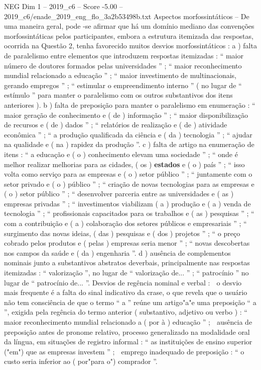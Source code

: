 \begin{textsample}{NEG Dim 1 – 2019\_c6 – Score -5.00 – 2019\_c6/enade\_2019\_eng\_flo\_3a2b53498b.txt}
Aspectos morfossintáticos – De uma maneira geral, pode -se afirmar que há um domínio mediano das convenções morfossintáticas pelos participantes, embora a estrutura itemizada das respostas, ocorrida na Questão 2, tenha favorecido muitos desvios morfossintáticos : a ) falta de paralelismo entre elementos que introduzem respostas itemizadas : “ maior número de doutores formados pelas universidades ” ; “ maior reconhecimento mundial relacionado a educação ” ; “ maior investimento de multinacionais, gerando empregos ” ; “ estimular o empreendimento interno ” ( no lugar de “ estímulo ” para manter o paralelismo com os outros substantivos dos itens anteriores ). b ) falta de preposição para manter o paralelismo em enumeração : “ maior geração de conhecimento e ( de ) informação ” ; “ maior disponibilização de recursos e ( de ) dados ” ; “ relatórios de realização e ( de ) atividade econômica ” ; “ a produção qualificada da ciência e ( da ) tecnologia ” ; “ ajudar na qualidade e ( na ) rapidez da produção ”. c ) falta de artigo na enumeração de itens : “ a educação e ( o ) conhecimento elevam uma sociedade ” ; “ onde é melhor realizar melhorias para as cidades, ( os ) \textbf{estados} e ( o ) país ” ; “ isso volta como serviço para as empresas e ( o ) setor público ” ; “ juntamente com o setor privado e ( o ) público ” ; “ criação de novas tecnologias para as empresas e ( o ) setor público ” ; “ desenvolver parceria entre as universidades e ( as ) empresas privadas ” ; “ investimentos viabilizam ( a ) produção e ( a ) venda de tecnologia ” ; “ profissionais capacitados para os trabalhos e ( as ) pesquisas ” ; “ com a contribuição e ( a ) colaboração dos setores públicos e empresariais ” ; “ surgimento das novas ideias, ( das ) pesquisas e ( dos ) projetos ” ; “ o preço cobrado pelos produtos e ( pelas ) empresas seria menor ” ; “ novas descobertas nos campos da saúde e ( da ) engenharia ”. d ) ausência de complementos nominais junto a substantivos abstratos deverbais, principalmente nas respostas itemizadas : “ valorização ”, no lugar de “ valorização de... ” ; “ patrocínio ” no lugar de “ patrocínio de... ”.
Desvios de regência nominal e verbal :  o desvio mais frequente é a falta do sinal indicativo da crase, o que revela que o usuário não tem consciência de que o termo “ a ” reúne um artigo"a"e uma preposição “ a ”, exigida pela regência do termo anterior ( substantivo, adjetivo ou verbo ) : “ maior reconhecimento mundial relacionado a ( por à ) educação ” ;  ausência de preposição antes de pronome relativo, processo generalizado na modalidade oral da língua, em situações de registro informal : “ as instituições de ensino superior ("em") que as empresas investem ” ;  emprego inadequado de preposição : “ o custo seria inferior ao ( por"para o") comprador ”.

\end{textsample}
